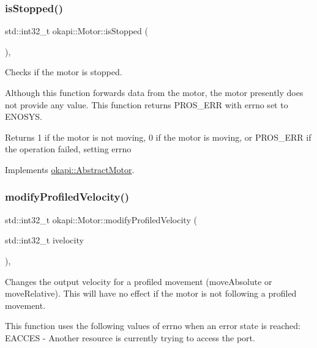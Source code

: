 \subsubsection{\texorpdfstring{isStopped()}{isStopped()}}
{\footnotesize\ttfamily std\+::int32\+\_\+t okapi\+::\+Motor\+::is\+Stopped (\begin{DoxyParamCaption}{ }\end{DoxyParamCaption})\hspace{0.3cm}{\ttfamily [override]}, {\ttfamily [virtual]}}

Checks if the motor is stopped.

Although this function forwards data from the motor, the motor presently does not provide any value. This function returns P\+R\+O\+S\+\_\+\+E\+RR with errno set to E\+N\+O\+S\+YS. \begin{DoxyReturn}{Returns}
1 if the motor is not moving, 0 if the motor is moving, or P\+R\+O\+S\+\_\+\+E\+RR if the operation failed, setting errno 
\end{DoxyReturn}


Implements \mbox{\hyperlink{classokapi_1_1AbstractMotor_aa46c96a6eec7921ad5b12fcd4119358e}{okapi\+::\+Abstract\+Motor}}.

\mbox{\label{classokapi_1_1Motor_a8778f90005a3add64d0dfd7574fb8289}} 
\subsubsection{\texorpdfstring{modifyProfiledVelocity()}{modifyProfiledVelocity()}}
{\footnotesize\ttfamily std\+::int32\+\_\+t okapi\+::\+Motor\+::modify\+Profiled\+Velocity (\begin{DoxyParamCaption}\item[{std\+::int32\+\_\+t}]{ivelocity }\end{DoxyParamCaption})\hspace{0.3cm}{\ttfamily [override]}, {\ttfamily [virtual]}}

Changes the output velocity for a profiled movement (move\+Absolute or move\+Relative). This will have no effect if the motor is not following a profiled movement.

This function uses the following values of errno when an error state is reached\+: E\+A\+C\+C\+ES -\/ Another resource is currently trying to access the port.


